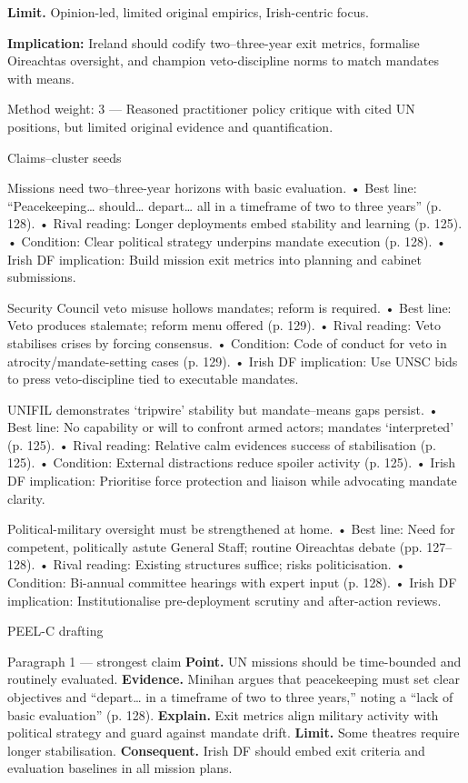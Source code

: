 \textbf{Limit.} Opinion-led, limited original empirics, Irish-centric focus.

\textbf{Implication:} Ireland should codify two–three-year exit metrics, formalise Oireachtas oversight, and champion veto-discipline norms to match mandates with means.

Method weight: 3 — Reasoned practitioner policy critique with cited UN positions, but limited original evidence and quantification.

Claims–cluster seeds

Missions need two–three-year horizons with basic evaluation.
• Best line: “Peacekeeping… should… depart… all in a timeframe of two to three years” (p. 128).
• Rival reading: Longer deployments embed stability and learning (p. 125).
• Condition: Clear political strategy underpins mandate execution (p. 128).
• Irish DF implication: Build mission exit metrics into planning and cabinet submissions.

Security Council veto misuse hollows mandates; reform is required.
• Best line: Veto produces stalemate; reform menu offered (p. 129).
• Rival reading: Veto stabilises crises by forcing consensus.
• Condition: Code of conduct for veto in atrocity/mandate-setting cases (p. 129).
• Irish DF implication: Use UNSC bids to press veto-discipline tied to executable mandates.

UNIFIL demonstrates ‘tripwire’ stability but mandate–means gaps persist.
• Best line: No capability or will to confront armed actors; mandates ‘interpreted’ (p. 125).
• Rival reading: Relative calm evidences success of stabilisation (p. 125).
• Condition: External distractions reduce spoiler activity (p. 125).
• Irish DF implication: Prioritise force protection and liaison while advocating mandate clarity.

Political-military oversight must be strengthened at home.
• Best line: Need for competent, politically astute General Staff; routine Oireachtas debate (pp. 127–128).
• Rival reading: Existing structures suffice; risks politicisation.
• Condition: Bi-annual committee hearings with expert input (p. 128).
• Irish DF implication: Institutionalise pre-deployment scrutiny and after-action reviews.

PEEL-C drafting

Paragraph 1 — strongest claim
\textbf{Point.} UN missions should be time-bounded and routinely evaluated. \textbf{Evidence.} Minihan argues that peacekeeping must set clear objectives and “depart… in a timeframe of two to three years,” noting a “lack of basic evaluation” (p. 128). \textbf{Explain.} Exit metrics align military activity with political strategy and guard against mandate drift. \textbf{Limit.} Some theatres require longer stabilisation. \textbf{Consequent.} Irish DF should embed exit criteria and evaluation baselines in all mission plans.

